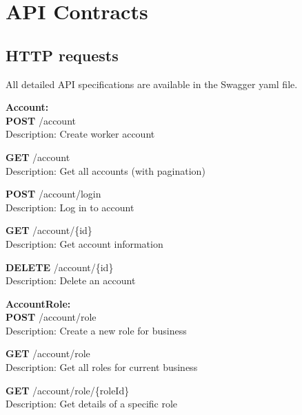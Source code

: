 \documentclass[11pt,a4paper,pdftex]{article}
\begin{document}
\section{API Contracts}

\subsection{HTTP requests}

All detailed API specifications are available in the Swagger yaml file.

\textbf{Account:}\\
\hspace*{1em}\textbf{POST} /account\\
\hspace*{2em}Description: Create worker account

\hspace*{1em}\textbf{GET} /account\\
\hspace*{2em}Description: Get all accounts (with pagination)

\hspace*{1em}\textbf{POST} /account/login\\
\hspace*{2em}Description: Log in to account

\hspace*{1em}\textbf{GET} /account/\{id\}\\
\hspace*{2em}Description: Get account information

\hspace*{1em}\textbf{DELETE} /account/\{id\}\\
\hspace*{2em}Description: Delete an account

\textbf{AccountRole:}\\
\hspace*{1em}\textbf{POST} /account/role\\
\hspace*{2em}Description: Create a new role for business

\hspace*{1em}\textbf{GET} /account/role\\
\hspace*{2em}Description: Get all roles for current business

\hspace*{1em}\textbf{GET} /account/role/\{roleId\}\\
\hspace*{2em}Description: Get details of a specific role
\end{document}
